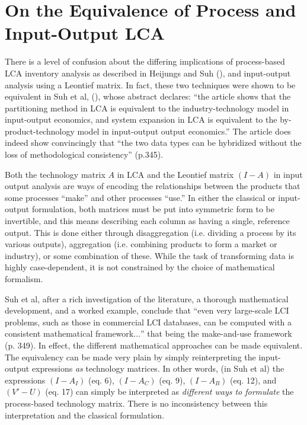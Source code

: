 \section{On the Equivalence of Process and Input-Output LCA}

There is a level of confusion about the differing implications of process-based LCA inventory analysis as described in Heijungs and Suh (\citeyear{Heijungs2002}), and input-output analysis using a Leontief matrix.  In fact, these two techniques were shown to be equivalent in Suh et al, (\citeyear{Suh_JIE_2010}), whose abstract declares: ``the article shows that the partitioning method in LCA is equivalent to the industry-technology model in input-output economics, and system expansion in LCA is equivalent to the by-product-technology model in input-output output economics.''  The article does indeed show convincingly that ``the two data types can be hybridized without the loss of methodological consistency'' (p.345).

   Both the technology matrix $A$ in LCA and the Leontief matrix $(I-A)$ in input output analysis are ways of encoding the relationships between the products that some processes ``make'' and other processes ``use.''  In either the classical or input-output formulation, both matrices must be put into symmetric form to be invertible, and this means describing each column as having a single, reference output.  This is done either through disaggregation (i.e. dividing a process by its various outputs), aggregation (i.e. combining products to form a market or industry), or some combination of these.  While the task of transforming data is highly case-dependent, it is not constrained by the choice of mathematical formalism.  
   
   Suh et al, after a rich investigation of the literature, a thorough mathematical development, and a worked example, conclude that ``even very large-scale LCI problems, such as those in commercial LCI databases, can be computed with a consistent mathematical framework$\ldots$'' that being the make-and-use framework (p. 349).  In effect, the different mathematical approaches can be made equivalent.  The equivalency can be made very plain by simply reinterpreting the input-output expressions \textit{as} technology matrices.  In other words, (in Suh et al) the expressions $(I-A_I)$ (eq. 6), $(I-A_C)$ (eq. 9), $(I-A_B)$ (eq. 12), and $(V'-U)$ (eq. 17) can simply be interpreted as \textit{different ways to formulate} the process-based technology matrix.  There is no inconsistency between this interpretation and the classical formulation.  

